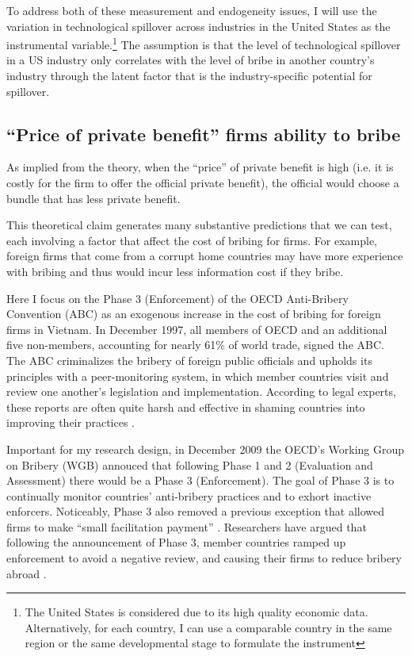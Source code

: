 To address both of these measurement and endogeneity issues, I will use the variation in technological spillover across industries in the United States as the instrumental variable.\footnote{The United States is considered due to its high quality economic data. Alternatively, for each country, I can use a comparable country in the same region or the same developmental stage to formulate the instrument} The assumption is that the level of technological spillover in a US industry only correlates with the level of bribe in another country's industry through the latent factor that is the industry-specific potential for spillover.

\subsection{``Price of private benefit'' firms ability to bribe}

As implied from the theory, when the ``price'' of private benefit is high (i.e. it is costly for the firm to offer the official private benefit), the official would choose a bundle that has less private benefit.

This theoretical claim generates many substantive predictions that we can test, each involving a factor that affect the cost of bribing for firms. For example, foreign firms that come from a corrupt home countries may have more experience with bribing and thus would incur less information cost if they bribe.

Here I focus on the Phase 3 (Enforcement) of the OECD Anti-Bribery Convention (ABC) as an exogenous increase in the cost of bribing for foreign firms in Vietnam. In December 1997, all members of OECD and an additional five non-members, accounting for nearly 61\% of world trade, signed the ABC. The ABC criminalizes the bribery of foreign public officials and upholds its principles with a peer-monitoring system, in which member countries visit and review one another's legislation and implementation. According to legal experts, these reports are often quite harsh and effective in shaming countries into improving their practices \citep{Tyler2011}.

Important for my research design, in December 2009 the OECD's Working Group on Bribery (WGB) annouced that following Phase 1 and 2 (Evaluation and Assessment) there would be a Phase 3 (Enforcement). The goal of Phase 3 is to continually monitor countries' anti-bribery practices and to exhort inactive enforcers. Noticeably, Phase 3 also removed a previous exception that allowed firms to make ``small facilitation payment'' \citep{Strauss2013}. Researchers have argued that following the announcement of Phase 3, member countries ramped up enforcement to avoid a negative review, and causing their firms to reduce bribery abroad \citep{Malesky2015b}. 

